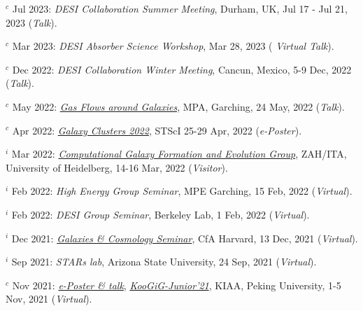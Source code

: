 \documentclass[12pt,letterpaper]{article}
\begin{document}
\begin{list}{}{\cvlist}
\item $^c$ Jul 2023:  \emph{DESI Collaboration Summer Meeting}, Durham, UK, Jul 17 - Jul 21, 2023 (\textit{Talk}). 
\item $^c$ Mar 2023:  \emph{DESI Absorber Science Workshop}, Mar 28, 2023 (\textit{ Virtual Talk}).   
\item $^c$ Dec 2022:  \emph{DESI Collaboration Winter Meeting}, Cancun, Mexico, 5-9 Dec, 2022 (\textit{Talk}).   
\item $^c$ May 2022:  \emph{\href{https://indico.ph.tum.de/event/7018/}{Gas Flows around Galaxies}}, MPA, Garching, 24 May, 2022 (\textit{Talk}).   
\item $^c$ Apr 2022:  \emph{\href{https://www.stsci.edu/contents/events/stsci/2022/april/galaxy-clusters-2022-challenging-our-cosmological-perspectives}{Galaxy Clusters 2022}}, STScI 25-29 Apr, 2022 (\textit{e-Poster}).   
\item $^i$ Mar 2022:  \emph{\href{https://zah.uni-heidelberg.de/research-groups\#c2659}{Computational Galaxy Formation and Evolution Group}}, ZAH/ITA, University of Heidelberg, 14-16 Mar, 2022 (\textit{Visitor}).   
\item $^i$ Feb 2022:  \emph{High Energy Group Seminar}, MPE Garching, 15 Feb, 2022 (\textit{Virtual}).   
\item $^i$ Feb 2022:  \emph{DESI Group Seminar}, Berkeley Lab, 1 Feb, 2022 (\textit{Virtual}).   
\item $^i$ Dec 2021:  \emph{\href{https://pweb.cfa.harvard.edu/calendar/event/9298}{Galaxies \& Cosmology Seminar}}, CfA Harvard, 13 Dec, 2021 (\textit{Virtual}).   
\item $^i$ Sep 2021:  \textit{STARs lab}, Arizona State University, 24 Sep, 2021 (\textit{Virtual}).   

\item $^c$ Nov 2021:  \emph{\href{https://www.bilibili.com/video/BV1nv411M7w3}{e-Poster \& talk}}, \emph{\href{https://kiaa.pku.edu.cn/KooGig_junior21/Home.htm}{KooGiG-Junior'21}}, KIAA, Peking University, 1-5 Nov, 2021 (\textit{Virtual}).   


\end{list}
\end{document}
